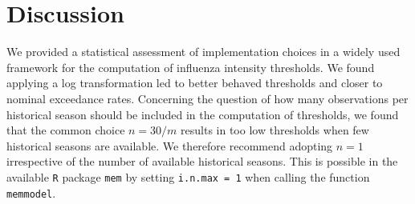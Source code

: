 \documentclass{article}
\begin{document}






\section{Discussion}
\label{sec:discussion}

We provided a statistical assessment of implementation choices in a widely used framework for the computation of influenza intensity thresholds. We found applying a log transformation led to better behaved thresholds and closer to nominal exceedance rates. Concerning the question of how many observations per historical season should be included in the computation of thresholds, we found that the common choice $n = 30/m$ results in too low thresholds when few historical seasons are available. We therefore recommend adopting $n = 1$ irrespective of the number of available historical seasons. This is possible in the available \texttt{R} package \texttt{mem} by setting \texttt{i.n.max = 1} when calling the function \texttt{memmodel}.
\end{document}
